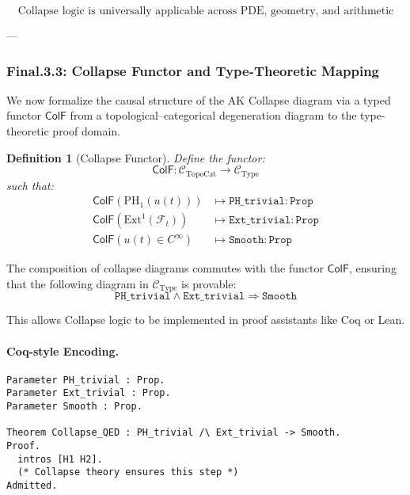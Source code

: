 \documentclass[11pt]{article}
\newtheorem{definition}[theorem]{Definition}
\begin{document}
\begin{axiom}
\begin{axiom}
{{\[
\boxed{
\text{Collapse logic is universally applicable across PDE, geometry, and arithmetic}
}
\]

---

\subsubsection*{Final.3.3: Collapse Functor and Type-Theoretic Mapping}

We now formalize the causal structure of the AK Collapse diagram via a typed functor \( \mathsf{ColF} \)  
from a topological–categorical degeneration diagram to the type-theoretic proof domain.

\begin{definition}[Collapse Functor]
Define the functor:
\[
\mathsf{ColF} : \mathcal{C}_{\mathrm{TopoCat}} \to \mathcal{C}_{\mathrm{Type}}
\]
such that:
\[
\begin{aligned}
\mathsf{ColF}(\mathrm{PH}_1(u(t))) &\mapsto \texttt{PH\_trivial} : \texttt{Prop} \\
\mathsf{ColF}(\mathrm{Ext}^1(\mathcal{F}_t)) &\mapsto \texttt{Ext\_trivial} : \texttt{Prop} \\
\mathsf{ColF}(u(t) \in C^\infty) &\mapsto \texttt{Smooth} : \texttt{Prop}
\end{aligned}
\]
\end{definition}

\begin{proposition}
The composition of collapse diagrams commutes with the functor \( \mathsf{ColF} \),  
ensuring that the following diagram in \( \mathcal{C}_{\mathrm{Type}} \) is provable:
\[
\texttt{PH\_trivial} \land \texttt{Ext\_trivial} \Rightarrow \texttt{Smooth}
\]

This allows Collapse logic to be implemented in proof assistants like Coq or Lean.
\end{proposition}

\paragraph{Coq-style Encoding.}
\begin{lstlisting}[language=Coq]
Parameter PH_trivial : Prop.
Parameter Ext_trivial : Prop.
Parameter Smooth : Prop.

Theorem Collapse_QED : PH_trivial /\ Ext_trivial -> Smooth.
Proof.
  intros [H1 H2].
  (* Collapse theory ensures this step *)
Admitted.
\end{lstlisting}

}}
\end{axiom}
\end{axiom}
\end{document}
